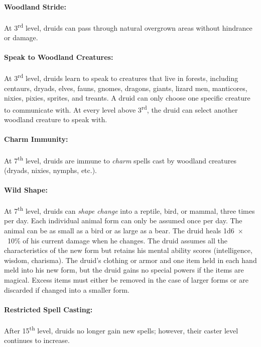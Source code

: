 \begin{multicols}{2}
\paragraph{Woodland Stride:} At 3\textsuperscript{rd} level, druids can pass through natural overgrown areas without hindrance or damage.

\paragraph{Speak to Woodland Creatures:} At 3\textsuperscript{rd} level, druids learn to speak to creatures that live in forests, including centaurs, dryads, elves, fauns, gnomes, dragons, giants, lizard men, manticores, nixies, pixies, sprites, and treants.  A druid can only choose one specific creature to communicate with.  At every level above 3\textsuperscript{rd}, the druid can select another woodland creature to speak with.

\paragraph{Charm Immunity:} At 7\textsuperscript{th} level, druids are immune to \textit{charm} spells cast by woodland creatures (dryads, nixies, nymphs, etc.). 

\paragraph{Wild Shape:} At 7\textsuperscript{th} level, druids can \textit{shape change} into a reptile, bird, or mammal, three times per day.  Each individual animal form can only be assumed once per day.  The animal can be as small as a bird or as large as a bear.  The druid heals 1d6~$\times$~10\% of his current damage when he changes.  The druid assumes all the characteristics of the new form but retains his mental ability scores (intelligence, wisdom, charisma).  The druid's clothing or armor and one item held in each hand meld into his new form, but the druid gains no special powers if the items are magical.  Excess items must either be removed in the case of larger forms or are discarded if changed into a smaller form.

\paragraph{Restricted Spell Casting:} After 15\textsuperscript{th} level, druids no longer gain new spells; however, their caster level continues to increase.


\end{multicols}
